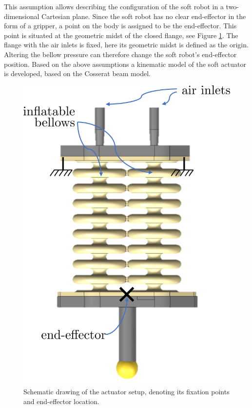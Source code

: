 This assumption allows describing the configuration of the soft robot in a two-dimensional Cartesian plane. Since the soft robot has no clear end-effector in the form of a gripper, a point on the body is assigned to be the end-effector. This point is situated at the geometric midst of the closed flange, see Figure \ref{fig2:setup}. The flange with the air inlets is fixed, here its geometric midst is defined as the origin. Altering the bellow pressure can therefore change the soft robot's end-effector position. Based on the above assumptions a kinematic model of the soft actuator is developed, based on the Cosserat beam model. 



\begin{figure}[H]
\begin{minipage}{.5\textwidth}
  \centering
  \includegraphics[width =0.8\linewidth]{Figures/Chapter2/setup.png}
  \caption{Schematic drawing of the actuator setup, denoting its fixation points and end-effector location.}
  \label{fig2:setup}
\end{minipage}
\begin{minipage}{.5\textwidth}
  \centering

\end{minipage}
\end{figure}
